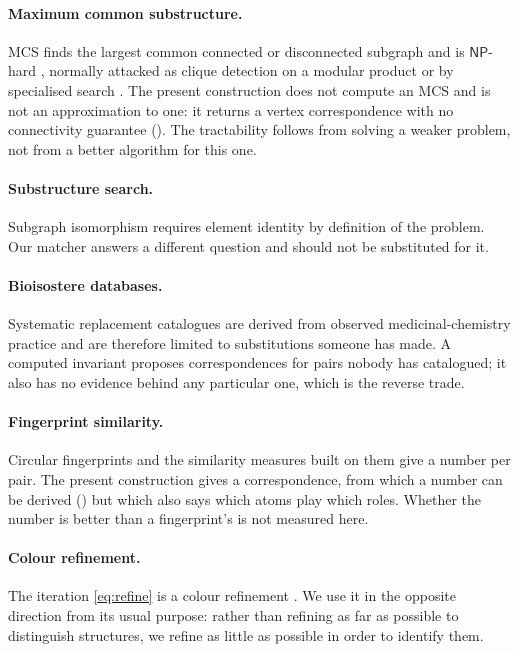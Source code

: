 \documentclass[11pt,twocolumn,a4paper]{article}
\theoremstyle{scthm}
\theoremstyle{definition}
\theoremstyle{remark}
\begin{document}
\paragraph{Maximum common substructure.} MCS finds the largest common
connected or disconnected subgraph and is $\mathsf{NP}$-hard
\citep{garey1979,raymond2002,ehrlich2011}, normally attacked as clique
detection on a modular product \citep{barrow1976,bron1973} or by
specialised search \citep{cao2008,dalke2013}. The present construction
does not compute an MCS and is not an approximation to one: it returns a
vertex correspondence with no connectivity guarantee
(). The tractability follows from solving a weaker
problem, not from a better algorithm for this one.

\paragraph{Substructure search.} Subgraph isomorphism
\citep{ullmann1976,cordella2004,ehrlich2012} requires element identity by
definition of the problem. Our matcher answers a different question and
should not be substituted for it.

\paragraph{Bioisostere databases.} Systematic replacement catalogues
\citep{wirth2013} are derived from observed medicinal-chemistry practice
and are therefore limited to substitutions someone has made. A computed
invariant proposes correspondences for pairs nobody has catalogued; it
also has no evidence behind any particular one, which is the reverse
trade.

\paragraph{Fingerprint similarity.} Circular fingerprints
\citep{rogers2010} and the similarity measures built on them
\citep{willett1998,maggiora2014} give a number per pair. The present
construction gives a correspondence, from which a number can be derived
() but which also says which atoms play which roles.
Whether the number is better than a fingerprint's is not measured here.

\paragraph{Colour refinement.} The iteration \eqref{eq:refine} is a colour
refinement \citep{weisfeiler1968,arvind2015}. We use it in the opposite
direction from its usual purpose: rather than refining as far as possible
to distinguish structures, we refine as little as possible in order to
identify them.
\end{document}
